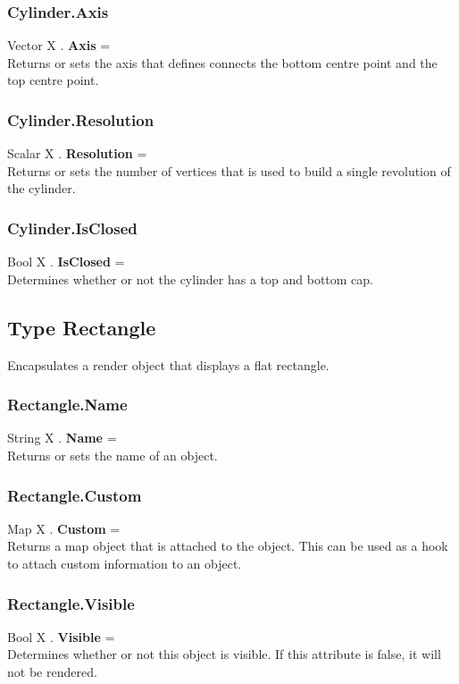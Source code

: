 \documentclass[10pt]{book}
\begin{document}
\subsubsection{Cylinder.Axis \label{F:Cylinder:Axis}}
Vector X . \textbf{Axis} = \\
Returns or sets the axis that defines connects the bottom centre point and the top centre point.

\subsubsection{Cylinder.Resolution \label{F:Cylinder:Resolution}}
Scalar X . \textbf{Resolution} = \\
Returns or sets the number of vertices that is used to build a single revolution of the cylinder.

\subsubsection{Cylinder.IsClosed \label{F:Cylinder:IsClosed}}
Bool X . \textbf{IsClosed} = \\
Determines whether or not the cylinder has a top and bottom cap.

\subsection{Type Rectangle \label{T:Rectangle}}
Encapsulates a render object that displays a flat rectangle.

\subsubsection{Rectangle.Name \label{F:Rectangle:Name}}
String X . \textbf{Name} = \\
Returns or sets the name of an object.

\subsubsection{Rectangle.Custom \label{F:Rectangle:Custom}}
Map X . \textbf{Custom} = \\
Returns a map object that is attached to the object. This can be used as a hook to attach custom information to an object.


\subsubsection{Rectangle.Visible \label{F:Rectangle:Visible}}
Bool X . \textbf{Visible} = \\
Determines whether or not this object is visible. If this attribute is false, it will not be rendered.
\end{document}
